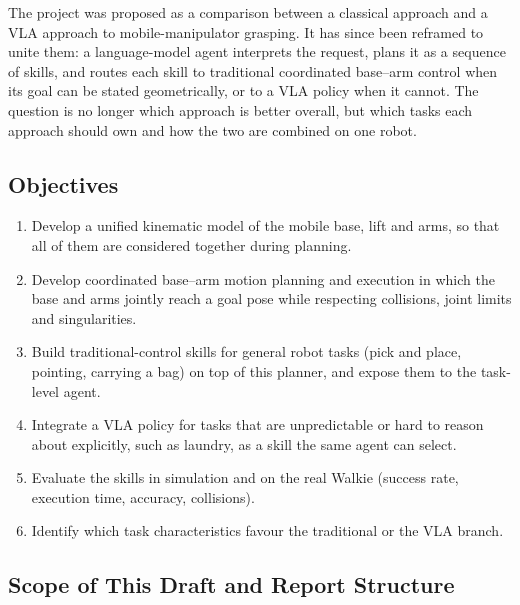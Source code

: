 \documentclass[12pt,a4paper]{article}
\begin{document}
The project was proposed as a comparison between a classical approach and a VLA approach to
mobile-manipulator grasping. It has since been reframed to unite them: a language-model agent
interprets the request, plans it as a sequence of skills, and routes each skill to traditional
coordinated base--arm control when its goal can be stated geometrically, or to a VLA policy when it
cannot. The question is no longer which approach is better overall, but which tasks each approach
should own and how the two are combined on one robot.

\subsection{Objectives}

\begin{enumerate}
  \item Develop a unified kinematic model of the mobile base, lift and arms, so that all of them
        are considered together during planning.
  \item Develop coordinated base--arm motion planning and execution in which the base and arms
        jointly reach a goal pose while respecting collisions, joint limits and singularities.
  \item Build traditional-control skills for general robot tasks (pick and place, pointing, carrying a bag)
        on top of this planner, and expose them to the task-level agent.
  \item Integrate a VLA policy for tasks that are unpredictable or hard to reason about explicitly,
        such as laundry, as a skill the same agent can select.
  \item Evaluate the skills in simulation and on the real Walkie (success rate, execution time,
        accuracy, collisions).
  \item Identify which task characteristics favour the traditional or the VLA branch.
\end{enumerate}

\subsection{Scope of This Draft and Report Structure}
\end{document}
